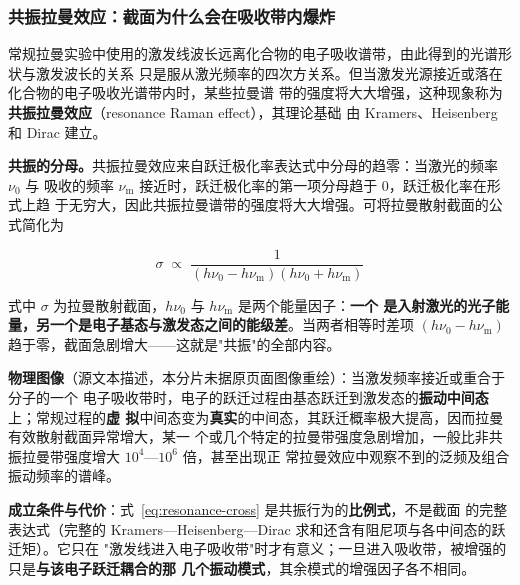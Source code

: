 \subsubsection{共振拉曼效应：截面为什么会在吸收带内爆炸}
\label{sec:ch06b-resonance}

常规拉曼实验中使用的激发线波长远离化合物的电子吸收谱带，由此得到的光谱形状与激发波长的关系
只是服从激光频率的四次方关系。但当激发光源接近或落在化合物的电子吸收光谱带内时，某些拉曼谱
带的强度将大大增强，这种现象称为\textbf{共振拉曼效应}（resonance Raman effect），其理论基础
由 Kramers、Heisenberg 和 Dirac 建立。

\begin{principle}
\textbf{共振的分母。}共振拉曼效应来自跃迁极化率表达式中分母的趋零：当激光的频率 $\nu_0$ 与
吸收的频率 $\nu_{\mathrm{m}}$ 接近时，跃迁极化率的第一项分母趋于 $0$，跃迁极化率在形式上趋
于无穷大，因此共振拉曼谱带的强度将大大增强。可将拉曼散射截面的公式简化为

\begin{equation}
\sigma \;\propto\; \frac{1}{\left(h\nu_0-h\nu_{\mathrm{m}}\right)\left(h\nu_0+h\nu_{\mathrm{m}}\right)}
\label{eq:resonance-cross}
\end{equation}

式中 $\sigma$ 为拉曼散射截面，$h\nu_0$ 与 $h\nu_{\mathrm{m}}$ 是两个能量因子：\textbf{一个
是入射激光的光子能量，另一个是电子基态与激发态之间的能级差}。当两者相等时差项
$(h\nu_0-h\nu_{\mathrm{m}})$ 趋于零，截面急剧增大——这就是"共振"的全部内容。

\textbf{物理图像}（源文本描述，本分片未据原页面图像重绘）：当激发频率接近或重合于分子的一个
电子吸收带时，电子的跃迁过程由基态跃迁到激发态的\textbf{振动中间态}上；常规过程的\textbf{虚
拟}中间态变为\textbf{真实}的中间态，其跃迁概率极大提高，因而拉曼有效散射截面异常增大，某一
个或几个特定的拉曼带强度急剧增加，一般比非共振拉曼带强度增大 $10^{4}$—$10^{6}$ 倍，甚至出现正
常拉曼效应中观察不到的泛频及组合振动频率的谱峰。

\textbf{成立条件与代价}：式~\eqref{eq:resonance-cross} 是共振行为的\textbf{比例式}，不是截面
的完整表达式（完整的 Kramers—Heisenberg—Dirac 求和还含有阻尼项与各中间态的跃迁矩）。它只在
"激发线进入电子吸收带"时才有意义；一旦进入吸收带，被增强的只是\textbf{与该电子跃迁耦合的那
几个振动模式}，其余模式的增强因子各不相同。


\end{principle}
